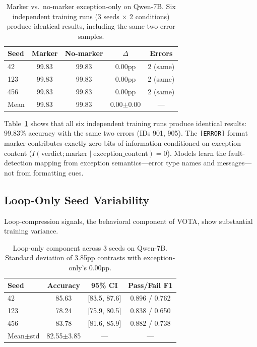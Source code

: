\documentclass[11pt,a4paper]{article}
\begin{document}
\begin{table}[t]
\centering
\small
\begin{tabular}{lcccc}
\toprule
\textbf{Seed} & \textbf{Marker} & \textbf{No-marker} & \textbf{$\Delta$} & \textbf{Errors} \\
\midrule
42  & 99.83 & 99.83 & 0.00pp & 2 (same) \\
123 & 99.83 & 99.83 & 0.00pp & 2 (same) \\
456 & 99.83 & 99.83 & 0.00pp & 2 (same) \\
\midrule
Mean & 99.83 & 99.83 & 0.00$\pm$0.00 & --- \\
\bottomrule
\end{tabular}
\caption{Marker vs.\ no-marker exception-only on Qwen-7B. Six independent training runs (3 seeds $\times$ 2 conditions) produce identical results, including the same two error samples.}
\label{tab:nomarker}
\end{table}

Table~\ref{tab:nomarker} shows that all six independent training runs produce identical results: 99.83\% accuracy with the same two errors (IDs 901, 905).
The \texttt{[ERROR]} format marker contributes exactly zero bits of information conditioned on exception content ($I(\text{verdict}; \text{marker} \mid \text{exception\_content}) = 0$).
Models learn the fault-detection mapping from exception semantics---error type names and messages---not from formatting cues.

\subsection{Loop-Only Seed Variability}

Loop-compression signals, the behavioral component of VOTA, show substantial training variance.

\begin{table}[t]
\centering
\small
\begin{tabular}{lccc}
\toprule
\textbf{Seed} & \textbf{Accuracy} & \textbf{95\% CI} & \textbf{Pass/Fail F1} \\
\midrule
42  & 85.63 & [83.5, 87.6] & 0.896 / 0.762 \\
123 & 78.24 & [75.9, 80.5] & 0.838 / 0.650 \\
456 & 83.78 & [81.6, 85.9] & 0.882 / 0.738 \\
\midrule
Mean$\pm$std & 82.55$\pm$3.85 & --- & --- \\
\bottomrule
\end{tabular}
\caption{Loop-only component across 3 seeds on Qwen-7B. Standard deviation of 3.85pp contrasts with exception-only's 0.00pp.}
\label{tab:loop-seeds}
\end{table}
\end{document}
